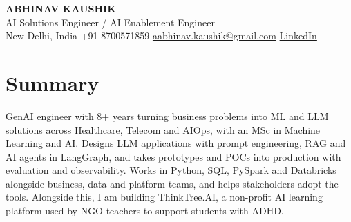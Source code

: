 \documentclass[10pt,a4paper]{article}
\begin{document}
\begin{center}
  {\LARGE\bfseries ABHINAV KAUSHIK}\\[2pt]
  {\large AI Solutions Engineer / AI Enablement Engineer}\\[2pt]
  New Delhi, India \textbar{} +91 8700571859 \textbar{} \href{mailto:aabhinav.kaushik@gmail.com}{aabhinav.kaushik@gmail.com} \textbar{} \href{https://www.linkedin.com/in/abhinav-kaushik10/}{LinkedIn}  
\end{center}

\section{Summary}
GenAI engineer with 8+ years turning business problems into ML and LLM solutions across Healthcare, Telecom and AIOps, with an MSc in Machine Learning and AI. Designs LLM applications with prompt engineering, RAG and AI agents in LangGraph, and takes prototypes and POCs into production with evaluation and observability. Works in Python, SQL, PySpark and Databricks alongside business, data and platform teams, and helps stakeholders adopt the tools. Alongside this, I am building ThinkTree.AI, a non-profit AI learning platform used by NGO teachers to support students with ADHD.
\end{document}

